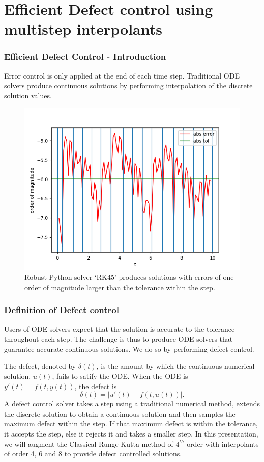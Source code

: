 \documentclass{beamer}
\begin{document}
\section{Efficient Defect control using multistep interpolants}
\begin{frame}
\frametitle{Efficient Defect Control - Introduction}
Error control is only applied at the end of each time step.
Traditional ODE solvers produce continuous solutions by performing interpolation of the discrete solution values.
\begin{figure}[H]
    \centering
    \includegraphics[width=0.7\linewidth]{./figures/no_middle_step_error_control_p3_rk45}
    \caption{Robust Python solver `RK45' produces solutions with errors of one order of magnitude larger than the tolerance within the step.}
    \label{fig:no_middle_step_error_control_p3_rk45}
\end{figure}
\end{frame}

\begin{frame}
\frametitle{Definition of Defect control}
Users of ODE solvers expect that the solution is accurate to the tolerance throughout each step.
The challenge is thus to produce ODE solvers that guarantee accurate continuous solutions. We do so by performing defect control.

The defect, denoted by $\delta(t)$,  is the amount by which the continuous numerical solution, $u(t)$, fails to satify the ODE. 
When the ODE is $y'(t) = f(t, y(t))$, the defect is 
\begin{equation}
\delta(t) = |u'(t) - f(t, u(t))|.
\end{equation}
A defect control solver takes a step using a traditional numerical method, extends the discrete solution to obtain a continuous solution and then samples the maximum defect within the step. If that maximum defect is within the tolerance, it accepts the step, else it rejects it and takes a smaller step.
\newline
In this presentation, we will augment the Classical Runge-Kutta method of $4^{th}$ order with interpolants of order 4, 6 and 8 to provide defect controlled solutions.
\end{frame}
\end{document}
